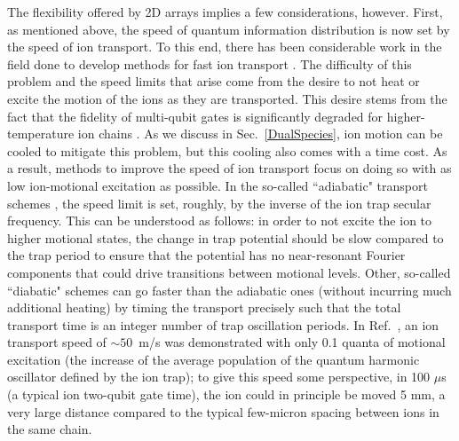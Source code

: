 \documentclass[%
reprint,
 amsmath,amssymb,
]{revtex4-1}
\begin{document}
The flexibility offered by 2D arrays implies a few considerations, however.  First, as mentioned above, the speed of quantum information distribution is now set by the speed of ion transport.  To this end, there has been considerable work in the field done to develop methods for fast ion transport \cite{BowlerDiabaticTransportSplit2012,WaltherDiabaticTransport2012,LuFastShuttling2018}.  The difficulty of this problem and the speed limits that arise come from the desire to not heat or excite the motion of the ions as they are transported.  This desire stems from the fact that the fidelity of multi-qubit gates is significantly degraded for higher-temperature ion chains \cite{KirchmairHotGates2009}.  As we discuss in Sec.~\ref{DualSpecies}, ion motion can be cooled to mitigate this problem, but this cooling also comes with a time cost.  As a result, methods to improve the speed of ion transport focus on doing so with as low ion-motional excitation as possible.  In the so-called ``adiabatic" transport schemes \cite{FurstTransportAnalysis2014}, the speed limit is set, roughly, by the inverse of the ion trap secular frequency.  This can be understood as follows: in order to not excite the ion to higher motional states, the change in trap potential should be slow compared to the trap period to ensure that the potential has no near-resonant Fourier components that could drive transitions between motional levels.  Other, so-called ``diabatic" schemes \cite{BowlerDiabaticTransportSplit2012,WaltherDiabaticTransport2012,LuFastShuttling2018} can go faster than the adiabatic ones (without incurring much additional heating) by timing the transport precisely such that the total transport time is an integer number of trap oscillation periods.  In Ref.~\cite{BowlerDiabaticTransportSplit2012}, an ion transport speed of ${\sim}50$~m/s was demonstrated with only 0.1 quanta of motional excitation (the increase of the average population of the quantum harmonic oscillator defined by the ion trap); to give this speed some perspective, in 100 $\mu$s (a typical ion two-qubit gate time), the ion could in principle be moved 5 mm, a very large distance compared to the typical few-micron spacing between ions in the same chain.
\end{document}

